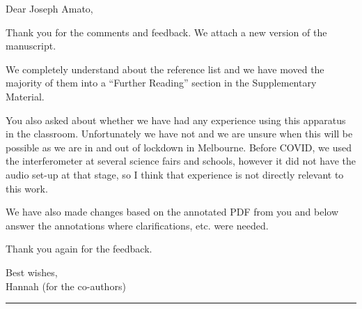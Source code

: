 \documentclass[a4paper, 10pt]{letter}
\begin{document}
Dear Joseph Amato, 

Thank you for the comments and feedback. 
We attach a new version of the manuscript.

We completely understand about the reference list and we have moved the majority of them into a ``Further Reading'' section in the Supplementary Material. 

You also asked about whether we have had any experience using this apparatus in the classroom. Unfortunately we have not and we are unsure when this will be possible as we are in and out of lockdown in Melbourne. Before COVID, we used the interferometer at several science fairs and schools, however it did not have the audio set-up at that stage, so I think that experience is not directly relevant to this work. 

We have also made changes based on the annotated PDF from you and below answer the annotations where clarifications, etc. were needed. 

Thank you again for the feedback. 

Best wishes, \\
Hannah (for the co-authors)

\noindent\rule{\textwidth}{0.5pt}
\end{document}
